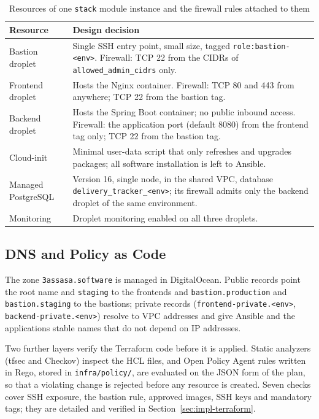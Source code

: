 \begin{table}[htbp]
\centering
\caption{Resources of one \texttt{stack} module instance and the firewall rules attached to them}
\label{tab:stack-module}
\renewcommand{\arraystretch}{1.1}
\small
\begin{tabularx}{\linewidth}{@{}l>{\raggedright\arraybackslash}X@{}}
\toprule
\textbf{Resource} & \textbf{Design decision} \\
\midrule
Bastion droplet & Single SSH entry point, small size, tagged \texttt{role:bastion-<env>}. Firewall: TCP 22 from the CIDRs of \texttt{allowed\_admin\_cidrs} only. \\
Frontend droplet & Hosts the Nginx container. Firewall: TCP 80 and 443 from anywhere; TCP 22 from the bastion tag. \\
Backend droplet & Hosts the Spring Boot container; no public inbound access. Firewall: the application port (default 8080) from the frontend tag only; TCP 22 from the bastion tag. \\
Cloud-init & Minimal user-data script that only refreshes and upgrades packages; all software installation is left to Ansible. \\
Managed PostgreSQL & Version 16, single node, in the shared VPC, database \texttt{delivery\_tracker\_<env>}; its firewall admits only the backend droplet of the same environment. \\
Monitoring & Droplet monitoring enabled on all three droplets. \\
\bottomrule
\end{tabularx}
\end{table}

\subsection{DNS and Policy as Code}

The zone \texttt{3assasa.software} is managed in DigitalOcean. Public records point the root name and \texttt{staging} to the frontends and \texttt{bastion.production} and \texttt{bastion.staging} to the bastions; private records (\texttt{frontend-private.<env>}, \texttt{backend-private.<env>}) resolve to VPC addresses and give Ansible and the applications stable names that do not depend on IP addresses.

Two further layers verify the Terraform code before it is applied. Static analyzers (tfsec and Checkov) inspect the HCL files, and Open Policy Agent rules written in Rego, stored in \texttt{infra/policy/}, are evaluated on the JSON form of the plan, so that a violating change is rejected before any resource is created. Seven checks cover SSH exposure, the bastion rule, approved images, SSH keys and mandatory tags; they are detailed and verified in Section~\ref{sec:impl-terraform}.

